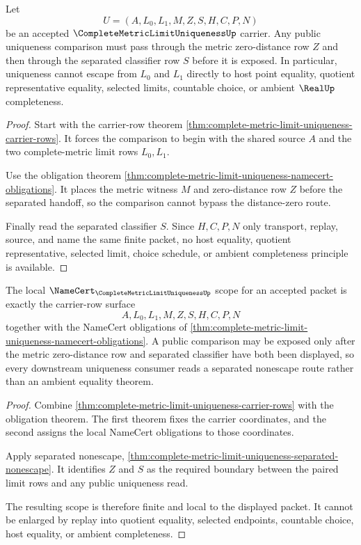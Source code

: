 \begin{theorem}
\label{thm:complete-metric-limit-uniqueness-separated-nonescape}
Let
$$
U=(A,L_{0},L_{1},M,Z,S,H,C,P,N)
$$
be an accepted $\CompleteMetricLimitUniquenessUp$ carrier. Any public uniqueness comparison must pass through the metric zero-distance row $Z$ and then through the separated classifier row $S$ before it is exposed. In particular, uniqueness cannot escape from $L_{0}$ and $L_{1}$ directly to host point equality, quotient representative equality, selected limits, countable choice, or ambient $\RealUp$ completeness.
\end{theorem}
\begin{proof}
Start with the carrier-row theorem \autoref{thm:complete-metric-limit-uniqueness-carrier-rows}. It forces the comparison to begin with the shared source $A$ and the two complete-metric limit rows $L_{0},L_{1}$.

Use the obligation theorem \autoref{thm:complete-metric-limit-uniqueness-namecert-obligations}. It places the metric witness $M$ and zero-distance row $Z$ before the separated handoff, so the comparison cannot bypass the distance-zero route.

Finally read the separated classifier $S$. Since $H,C,P,N$ only transport, replay, source, and name the same finite packet, no host equality, quotient representative, selected limit, choice schedule, or ambient completeness principle is available.
\end{proof}

\begin{theorem}
\label{thm:complete-metric-limit-uniqueness-namecert-scope}
The local $\NameCert_{\CompleteMetricLimitUniquenessUp}$ scope for an accepted packet is exactly the carrier-row surface
$$
A,L_{0},L_{1},M,Z,S,H,C,P,N
$$
together with the NameCert obligations of \autoref{thm:complete-metric-limit-uniqueness-namecert-obligations}. A public comparison may be exposed only after the metric zero-distance row and separated classifier have both been displayed, so every downstream uniqueness consumer reads a separated nonescape route rather than an ambient equality theorem.
\end{theorem}
\begin{proof}
Combine \autoref{thm:complete-metric-limit-uniqueness-carrier-rows} with the obligation theorem. The first theorem fixes the carrier coordinates, and the second assigns the local NameCert obligations to those coordinates.

Apply separated nonescape, \autoref{thm:complete-metric-limit-uniqueness-separated-nonescape}. It identifies $Z$ and $S$ as the required boundary between the paired limit rows and any public uniqueness read.

The resulting scope is therefore finite and local to the displayed packet. It cannot be enlarged by replay into quotient equality, selected endpoints, countable choice, host equality, or ambient completeness.
\end{proof}

